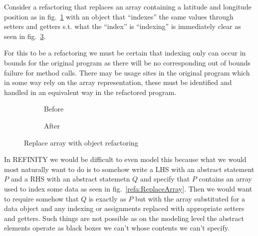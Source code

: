 Consider a refactoring that replaces an array containing a latitude and longitude position as in fig.~\ref{refa:ReplaceArray-before} with an object that ``indexes'' the same values through setters and getters s.t. what the ``index'' is ``indexing'' is immediately clear as seen in fig.~\ref{refa:ReplaceArray-after}.

For this to be a refactoring we must be certain that indexing only can occur in bounds for the original program as there will be no corresponding out of bounds failure for method calls. There may be usage sites in the original program which in some way rely on the array representation, these must be identified and handled in an equivalent way in the refactored program.

\begin{figure}
      \label{refa:ReplaceArray}
  \begin{subfigure}[h]{.45\linewidth}
    \label{refa:ReplaceArray-before}    
    
    \caption{Before}
  \end{subfigure}\hspace{1cm}
  \begin{subfigure}[h]{.45\linewidth}
    \label{refa:ReplaceArray-after}
    
    \caption{After}
  \end{subfigure}
  \caption{Replace array with object refactoring}
\end{figure}

In REFINITY we would be difficult to even model this because what we would most naturally want to do is to somehow write a LHS with an abstract statement $P$ and a RHS with an abstract statemetn $Q$ and specify that $P$ contains an array used to index some data as seen in fig.~\ref{refa:ReplaceArray}. Then we would want to require somehow that $Q$ is exactly as $P$ but with the array substituted for a data object and any indexing or assignments replaced with appropriate setters and getters. Such things are not possible as on the modeling level the abstract elements operate as black boxes we can't whose contents we can't specify.  
